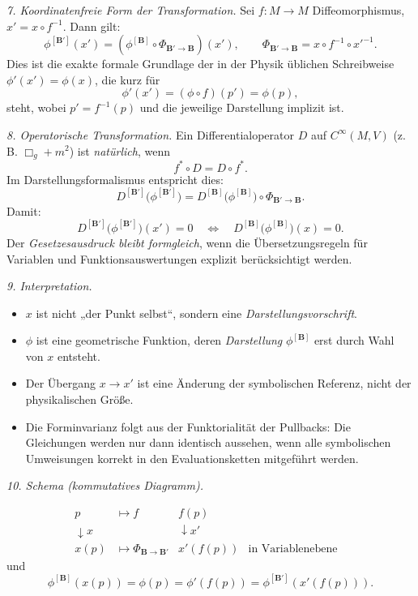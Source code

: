 \documentclass[10pt, letterpaper]{article}
\begin{document}
\bigskip
\emph{7. Koordinatenfreie Form der Transformation.}
Sei $f:M\to M$ Diffeomorphismus, $x' = x\circ f^{-1}$.
Dann gilt:
\[
\boxed{
\phi^{[\mathbf B']}(x') = (\phi^{[\mathbf B]}\circ \Phi_{\mathbf B'\to\mathbf B})(x'),
\qquad
\Phi_{\mathbf B'\to\mathbf B} = x\circ f^{-1}\circ x'^{-1}.
}
\]
Dies ist die exakte formale Grundlage der in der Physik üblichen Schreibweise
\(\phi'(x') = \phi(x)\), die kurz für
\[
\phi'(x') = (\phi\circ f)(p') = \phi(p),
\]
steht, wobei \(p'=f^{-1}(p)\) und die jeweilige Darstellung implizit ist.

\bigskip
\emph{8. Operatorische Transformation.}
Ein Differentialoperator $D$ auf $C^\infty(M,V)$ (z.\,B. $\Box_g+m^2$) ist \emph{natürlich}, wenn
\[
f^*\circ D = D\circ f^*.
\]
Im Darstellungsformalismus entspricht dies:
\[
D^{[\mathbf B']}\big(\phi^{[\mathbf B']}\big)
= D^{[\mathbf B]}\big(\phi^{[\mathbf B]}\big)\circ \Phi_{\mathbf B'\to\mathbf B}.
\]
Damit:
\[
D^{[\mathbf B']}\big(\phi^{[\mathbf B']}\big)(x') = 0
\quad\Longleftrightarrow\quad
D^{[\mathbf B]}\big(\phi^{[\mathbf B]}\big)(x)=0.
\]
Der \emph{Gesetzesausdruck bleibt formgleich}, wenn die Übersetzungsregeln für Variablen
und Funktionsauswertungen explizit berücksichtigt werden.

\bigskip
\emph{9. Interpretation.}
\begin{itemize}
\item $x$ ist nicht „der Punkt selbst“, sondern eine \emph{Darstellungsvorschrift}.
\item $\phi$ ist eine geometrische Funktion, deren \emph{Darstellung} $\phi^{[\mathbf B]}$
erst durch Wahl von $x$ entsteht.
\item Der Übergang $x\to x'$ ist eine Änderung der symbolischen Referenz, nicht der
physikalischen Größe.
\item Die Forminvarianz folgt aus der Funktorialität der Pullbacks: Die Gleichungen
werden nur dann identisch aussehen, wenn alle symbolischen Umweisungen korrekt
in den Evaluationsketten mitgeführt werden.
\end{itemize}

\bigskip
\emph{10. Schema (kommutatives Diagramm).}

\[
\begin{array}{ccccc}
p & \mapsto{f} & f(p) & & \\
\downarrow x & & \downarrow x' & & \\
x(p) & \mapsto{\Phi_{\mathbf B\to\mathbf B'}} & x'(f(p)) & \text{in Variablenebene} &
\end{array}
\]
und
\[
\phi^{[\mathbf B]}(x(p)) = \phi(p) = \phi'(f(p)) = \phi^{[\mathbf B']}(x'(f(p))).
\]
\end{document}
